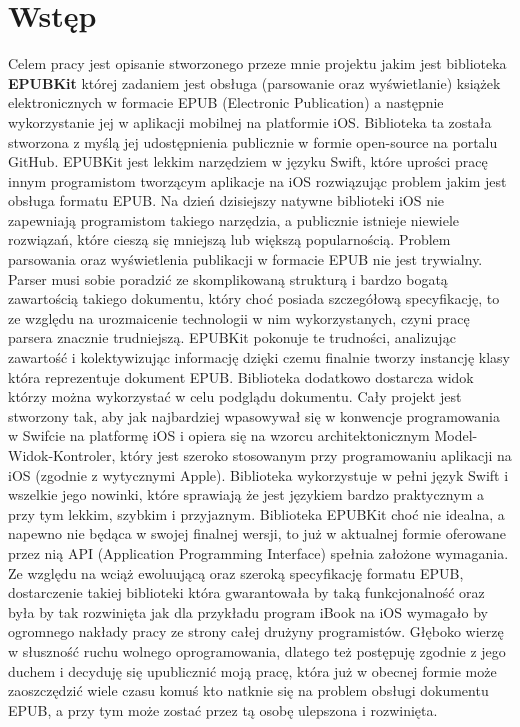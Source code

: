 \chapter{Wstęp}

Celem pracy jest opisanie stworzonego przeze mnie projektu jakim jest biblioteka \textbf{EPUBKit} której zadaniem jest obsługa (parsowanie oraz wyświetlanie) książek elektronicznych w formacie EPUB (Electronic Publication) a następnie wykorzystanie jej w aplikacji mobilnej na platformie iOS. Biblioteka ta została stworzona z myślą jej udostępnienia publicznie w formie open-source na portalu GitHub. EPUBKit jest lekkim narzędziem w języku Swift, które uprości pracę innym programistom tworzącym aplikacje na iOS rozwiązując problem jakim jest obsługa formatu EPUB. Na dzień dzisiejszy natywne biblioteki iOS nie zapewniają programistom takiego narzędzia, a publicznie istnieje niewiele rozwiązań, które cieszą się mniejszą lub większą popularnością. Problem parsowania oraz wyświetlenia publikacji w formacie EPUB nie jest trywialny. Parser musi sobie poradzić ze skomplikowaną strukturą i bardzo bogatą zawartością takiego dokumentu, który choć posiada szczegółową specyfikację, to ze względu na urozmaicenie technologii w nim wykorzystanych, czyni pracę parsera znacznie trudniejszą. EPUBKit pokonuje te trudności, analizując zawartość i kolektywizując informację dzięki czemu finalnie tworzy instancję klasy która reprezentuje dokument EPUB. Biblioteka dodatkowo dostarcza widok którzy można wykorzystać w celu podglądu dokumentu. Cały projekt jest stworzony tak, aby jak najbardziej wpasowywał się w konwencje programowania w Swifcie na platformę iOS i opiera się na wzorcu architektonicznym Model-Widok-Kontroler, który jest szeroko stosowanym przy programowaniu aplikacji na iOS (zgodnie z wytycznymi Apple). Biblioteka wykorzystuje w pełni język Swift i wszelkie jego nowinki, które sprawiają że jest językiem bardzo praktycznym a przy tym lekkim, szybkim i przyjaznym. Biblioteka EPUBKit choć nie idealna, a napewno nie będąca w swojej finalnej wersji, to już w aktualnej formie oferowane przez nią API (Application Programming Interface) spełnia założone wymagania. Ze względu na wciąż ewoluującą oraz szeroką specyfikację formatu EPUB, dostarczenie takiej biblioteki która gwarantowała by taką funkcjonalność oraz była by tak rozwinięta jak dla przykładu program iBook na iOS wymagało by ogromnego nakłady pracy ze strony całej drużyny programistów. Głęboko wierzę w słuszność ruchu wolnego oprogramowania, dlatego też postępuję zgodnie z jego duchem i decyduję się upublicznić moją pracę, która już w obecnej formie może zaoszczędzić wiele czasu komuś kto natknie się na problem obsługi dokumentu EPUB, a przy tym może zostać przez tą osobę ulepszona i rozwinięta.

